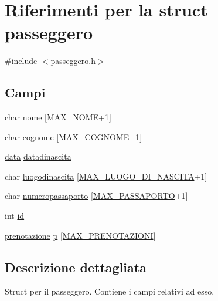 \hypertarget{structpasseggero}{}\section{Riferimenti per la struct passeggero}
\label{structpasseggero}


{\ttfamily \#include $<$passeggero.\+h$>$}

\subsection*{Campi}
\begin{DoxyCompactItemize}
\item 
char \hyperlink{structpasseggero_ac8f2fda50b9a745032f1ec9bebb452b3}{nome} \mbox{[}\hyperlink{define_8h_a650a929b45480c0875d8c814f442b6ac}{M\+A\+X\+\_\+\+N\+O\+ME}+1\mbox{]}
\item 
char \hyperlink{structpasseggero_af373fa9cc3d35c76a7ca974f020659a1}{cognome} \mbox{[}\hyperlink{define_8h_ae2433f35c071964de3e67f504e0f28aa}{M\+A\+X\+\_\+\+C\+O\+G\+N\+O\+ME}+1\mbox{]}
\item 
\hyperlink{structdata}{data} \hyperlink{structpasseggero_aa4bbbed19de9d525383a3fa5b1f30b39}{datadinascita}
\item 
char \hyperlink{structpasseggero_add5f60da89db3e535766d7da5a8d3c89}{luogodinascita} \mbox{[}\hyperlink{define_8h_ab6af835f1c2ed602bdca789eec14638a}{M\+A\+X\+\_\+\+L\+U\+O\+G\+O\+\_\+\+D\+I\+\_\+\+N\+A\+S\+C\+I\+TA}+1\mbox{]}
\item 
char \hyperlink{structpasseggero_a6f859dc8b0619484607e7e9c5cf7a22a}{numeropassaporto} \mbox{[}\hyperlink{define_8h_a880d733c8de2938a15cf9ddfc72fff2f}{M\+A\+X\+\_\+\+P\+A\+S\+S\+A\+P\+O\+R\+TO}+1\mbox{]}
\item 
int \hyperlink{structpasseggero_ac61046ccd664c38ce4edfeca6da85775}{id}
\item 
\hyperlink{structprenotazione}{prenotazione} \hyperlink{structpasseggero_aac3260f1220fe7270e1599e819482ed8}{p} \mbox{[}\hyperlink{define_8h_a3e58a49def600a497d69859a8860e70a}{M\+A\+X\+\_\+\+P\+R\+E\+N\+O\+T\+A\+Z\+I\+O\+NI}\mbox{]}
\end{DoxyCompactItemize}


\subsection{Descrizione dettagliata}
Struct per il passeggero. Contiene i campi relativi ad esso. 

